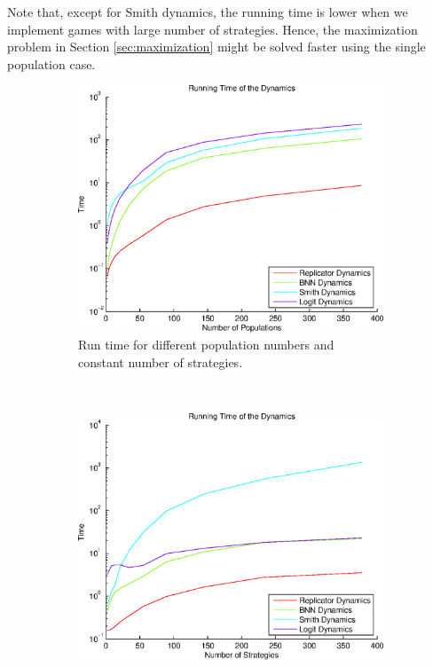 \documentclass[a4paper,10pt]{article}
\begin{document}
Note that, except for Smith dynamics, the running time is lower when we implement games with large number of strategies. Hence, the maximization problem in Section \ref{sec:maximization} might be solved faster using the single population case.



\begin{figure}
        \centering
        \begin{subfigure}[b]{0.45\textwidth}
		\includegraphics[width=1\textwidth]{./images/running_time_pop.eps}
                \caption{Run time for different population numbers and constant number of strategies.}
                \label{fig:run_time_pop}
        \end{subfigure}
        ~ 
        \begin{subfigure}[b]{0.45\textwidth}
		\includegraphics[width=1\textwidth]{./images/running_time_str.eps}

\end{subfigure}
\end{figure}
\end{document}
